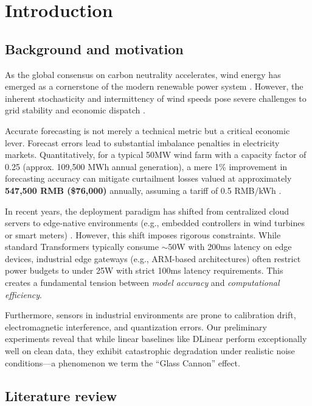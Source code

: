 \documentclass[review,3p,times,draft]{elsarticle}
\begin{document}
\section{Introduction}
\label{sec:intro}

\subsection{Background and motivation}
As the global consensus on carbon neutrality accelerates, wind energy has emerged as a cornerstone of the modern renewable power system \cite{council2023global,leroutier2022carbon}. However, the inherent stochasticity and intermittency of wind speeds pose severe challenges to grid stability and economic dispatch \cite{wang2022review}. 

Accurate forecasting is not merely a technical metric but a critical economic lever. Forecast errors lead to substantial imbalance penalties in electricity markets. Quantitatively, for a typical 50MW wind farm with a capacity factor of 0.25 (approx. 109,500 MWh annual generation), a mere 1\% improvement in forecasting accuracy can mitigate curtailment losses valued at approximately \textbf{547,500 RMB (\$76,000)} annually, assuming a tariff of 0.5 RMB/kWh \cite{millischer2023carrot}.

In recent years, the deployment paradigm has shifted from centralized cloud servers to edge-native environments (e.g., embedded controllers in wind turbines or smart meters) \cite{li2021edge}. However, this shift imposes rigorous constraints. While standard Transformers typically consume $\sim$50W with 200ms latency on edge devices, industrial edge gateways (e.g., ARM-based architectures) often restrict power budgets to under 25W with strict 100ms latency requirements. This creates a fundamental tension between \textit{model accuracy} and \textit{computational efficiency}.

Furthermore, sensors in industrial environments are prone to calibration drift, electromagnetic interference, and quantization errors. Our preliminary experiments reveal that while linear baselines like DLinear perform exceptionally well on clean data, they exhibit catastrophic degradation under realistic noise conditions---a phenomenon we term the ``Glass Cannon'' effect.

\subsection{Literature review}
\end{document}
